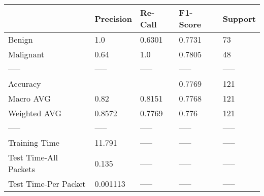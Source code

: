 \begin{tabular}{lllll}
\toprule
{} & Precision & Re-Call & F1-Score & Support \\
\midrule
Benign                &       1.0 &  0.6301 &   0.7731 &      73 \\
Malignant             &      0.64 &     1.0 &   0.7805 &      48 \\
-----                 &     ----- &   ----- &    ----- &   ----- \\
Accuracy              &           &         &   0.7769 &     121 \\
Macro AVG             &      0.82 &  0.8151 &   0.7768 &     121 \\
Weighted AVG          &    0.8572 &  0.7769 &    0.776 &     121 \\
-----                 &     ----- &   ----- &    ----- &   ----- \\
Training Time         &    11.791 &   ----- &    ----- &   ----- \\
Test Time-All Packets &     0.135 &   ----- &    ----- &   ----- \\
Test Time-Per Packet  &  0.001113 &   ----- &    ----- &   ----- \\
\bottomrule
\end{tabular}
